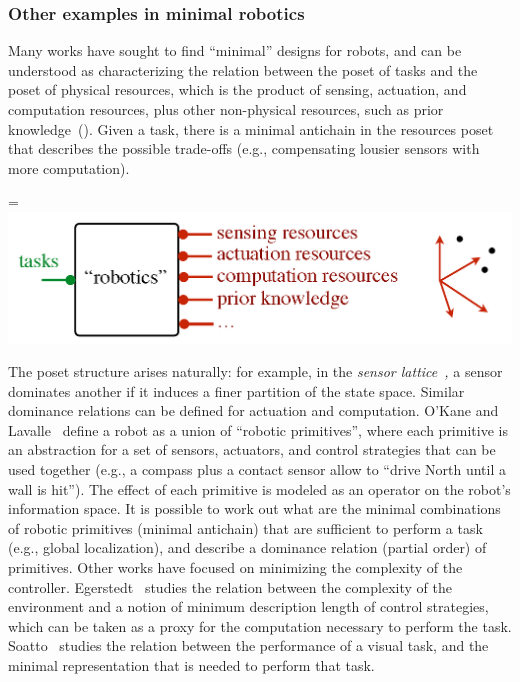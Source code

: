 \documentclass[twocolumn,english]{IEEEtran}
\theoremstyle{definition}
\theoremstyle{plain}
\theoremstyle{definition}
\theoremstyle{remark}
\theoremstyle{definition}
\theoremstyle{plain}
\theoremstyle{plain}
\newcommand{\colR}{\color[rgb]{0.555789,0.000000,0.000000}}
\newcommand{\colF}{\color[rgb]{0.094869,0.500000,0.000000}}
\newcommand{\R}[1]{{\colR #1}}
\newcommand{\F}[1]{{\colF #1}}
\newcommand*{\vcenteredhbox}[1]{\begingroup
\setbox0=\hbox{#1}\parbox{\wd0}{\box0}\endgroup}
\newcommand{\captionsideleft}[2]{
    \medskip
    \begin{minipage}{1.8cm}{
        \hfill
        \protect\captionof{figure}{#1}}\end{minipage}
    \begin{minipage}{6.6cm}
    
    \vcenteredhbox{{#2}}
    \hfill
    \end{minipage}
    \medskip
}
\begin{document}
\subsubsection*{Other examples in minimal robotics}

Many works have sought to find ``minimal'' designs for robots, and
can be understood as characterizing the relation between the poset
of \F{tasks} and the poset of physical resources, which is the product
of \R{sensing}, \R{actuation}, and \R{computation} resources,
plus other non-physical resources, such as \R{prior knowledge}~().
Given a task, there is a minimal antichain in the resources poset
that describes the possible trade-offs (e.g., compensating lousier
sensors with more computation). 

\captionsideleft{\label{fig:robot-generic}}{\includegraphics[scale=0.33]{batteries_okane}}

The poset structure arises naturally: for example, in the \emph{sensor
lattice}~\cite{lavalle12sensing}\emph{,} a sensor dominates another
if it induces a finer partition of the state space. Similar dominance
relations can be defined for actuation and computation. O'Kane and
Lavalle~\cite{okane08comparing} define a robot as a union of ``robotic
primitives'', where each primitive is an abstraction for a set of
sensors, actuators, and control strategies that can be used together
(e.g., a compass plus a contact sensor allow to ``drive North until
a wall is hit''). The effect of each primitive is modeled as an operator
on the robot's information space. It is possible to work out what
are the minimal combinations of robotic primitives (minimal antichain)
that are sufficient to perform a task (e.g., global localization),
and describe a dominance relation (partial order) of primitives. Other
works have focused on minimizing the complexity of the controller.
Egerstedt~\cite{egerstedt03motion} studies the relation between
the \F{complexity of the environment} and a notion of \R{minimum
description length of control strategies}, which can be taken as
a proxy for the computation necessary to perform the task. Soatto~\cite{soatto11steps}
studies the relation between the \F{performance of a visual task},
and the \R{ minimal representation} that is needed to perform that
task. 
\end{document}
